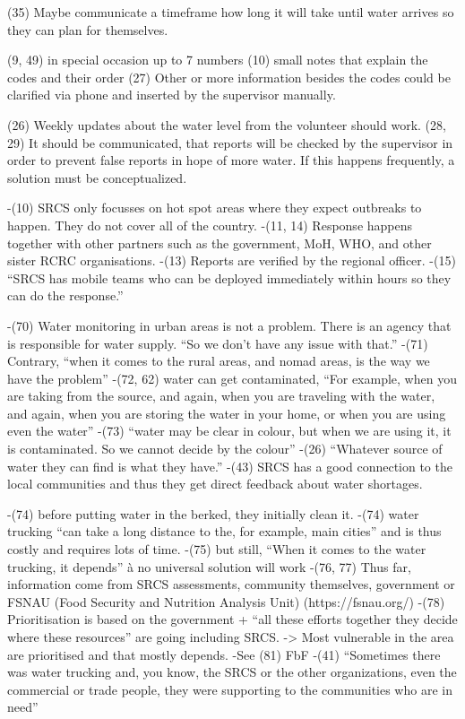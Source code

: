 (35) Maybe communicate a timeframe how long it will take until water arrives so they can plan for themselves.

(9, 49) in special occasion up to 7 numbers
(10) small notes that explain the codes and their order
(27) Other or more information besides the codes could be clarified via phone and inserted by the supervisor manually.

(26) Weekly updates about the water level from the volunteer should work.
(28, 29) It should be communicated, that reports will be checked by the supervisor in order to prevent false reports in hope of more water. If this happens frequently, a solution must be conceptualized.

-(10) SRCS only focusses on hot spot areas where they expect outbreaks to happen. They do not cover all of the country.
-(11, 14) Response happens together with other partners such as the government, MoH, WHO, and other sister RCRC organisations.
-(13) Reports are verified by the regional officer.
-(15) “SRCS has mobile teams who can be deployed immediately within hours so they can do the response.”

-(70) Water monitoring in urban areas is not a problem. There is an agency that is responsible for water supply. “So we don't have any issue with that.”
-(71) Contrary, “when it comes to the rural areas, and nomad areas, is the way we have the problem”
-(72, 62) water can get contaminated, “For example, when you are taking from the source, and again, when you are traveling with the water, and again, when you are storing the water in your home, or when you are using even the water”
-(73) “water may be clear in colour, but when we are using it, it is contaminated. So we cannot decide by the colour”
-(26) “Whatever source of water they can find is what they have.”
-(43) SRCS has a good connection to the local communities and thus they get direct feedback about water shortages.

-(74) before putting water in the berked, they initially clean it.
-(74) water trucking “can take a long distance to the, for example, main cities” and is thus costly and requires lots of time.
-(75) but still, “When it comes to the water trucking, it depends” à no universal solution will work
-(76, 77) Thus far, information come from SRCS assessments, community themselves, government or FSNAU (Food Security and Nutrition Analysis Unit) (https://fsnau.org/)
-(78) Prioritisation is based on the government + “all these efforts together they decide where these resources” are going including SRCS. -> Most vulnerable in the area are prioritised and that mostly depends.
-See (81) FbF
-(41) “Sometimes there was water trucking and, you know, the SRCS or the other organizations, even the commercial or trade people, they were supporting to the communities who are in need”

